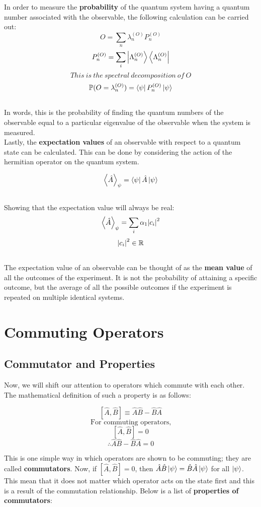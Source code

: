 \documentclass{article}
\begin{document}
\begin{flushleft}
In order to measure the \textbf{probability} of the quantum system having a quantum number associated with the observable, the following calculation can be carried out:\\
$$O=\sum_n\lambda_n^{(O)}P_n^{(O)}$$
$$P_n^{(O)}=\sum_i\ket{\Lambda_n^{(O)}}\bra{\Lambda_n^{(O)}}$$
$$This\ is\ the \ spectral\ decomposition\ of\ O$$
$$\mathbb{P}(O=\lambda_n^{(O)})=\bra\psi P_n^{(O)} \ket\psi$$\\

In words, this is the probability of finding the quantum numbers of the observable equal to a particular eigenvalue of the observable when the system is measured.\\[0.5cm]

Lastly, the \textbf{expectation values} of an observable with respect to a quantum state can be calculated. This can be done by considering the action of the hermitian operator on the quantum system.

$$\left\langle\hat{A}\right\rangle_\psi=\bra\psi\hat{A}\ket\psi$$\\
Showing that the expectation value will always be real:\\
$$\left\langle\hat{A}\right\rangle_\psi=\sum_i\alpha_1\abs{c_i}^2$$
$$\abs{c_i}^2\in\mathbb{R}$$\\

The expectation value of an observable can be thought of as the \textbf{mean value} of all the outcomes of the experiment. It is not the probability of attaining a specific outcome, but the average of all the possible outcomes if the experiment is repeated on multiple identical systems.
\pagebreak



\section{Commuting Operators}
\subsection{Commutator and Properties}
Now, we will shift our attention to operators which commute with each other. The mathematical definition of such a property is as follows:

$$[\hat{A},\hat{B}]\equiv\hat{A}\hat{B}-\hat{B}\hat{A}$$
$$\text{For\ commuting\ operators,}$$
$$[\hat{A},\hat{B}]=0$$
$$\therefore\hat{A}\hat{B}-\hat{B}\hat{A}=0$$
    
This is one simple way in which operators are shown to be commuting; they are called \textbf{commutators}. Now, if $[\hat{A},\hat{B}]=0$, then $\hat{A}\hat{B}\ket\psi=\hat{B}\hat{A}\ket\psi$ for all $\ket\psi$. This mean that it does not matter which operator acts on the state first and this is a result of the commutation relationship. Below is a list of \textbf{properties of commutators}:


\end{flushleft}
\end{document}
